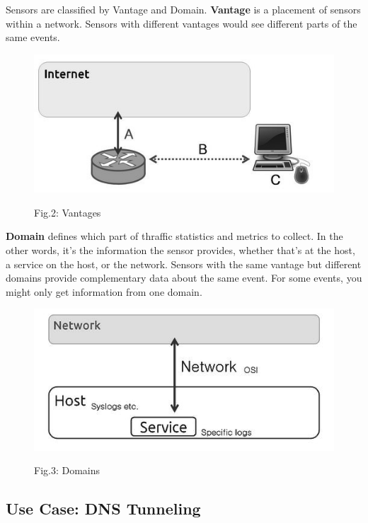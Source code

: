 \documentclass[10pt, a5paper]{article}
\begin{document}
Sensors are classified by Vantage and Domain. 
\textbf{Vantage} is a place\-ment of sensors within a network. Sensors with different vantages would see different parts of the same events.
\begin{figure}[h!]
  \centering 
  \includegraphics[scale=0.5]{16_2015_fig2}
    
  Fig.2: Vantages
\end{figure}

\textbf{Domain} defines which part of thraffic statistics and metrics to collect. In the other words, it's the information the sensor provides, whether that’s at the host, a service on the host, or the network. Sensors with the same vantage but different domains provide complementary data about the same event. For some events, you might only get informa\-tion from one domain.
\begin{figure}[h!]
  \centering 
  \includegraphics[scale=0.5]{16_2015_fig3}
    
  Fig.3: Domains
\end{figure}

\subsection*{Use Case: DNS Tunneling}
\end{document}
